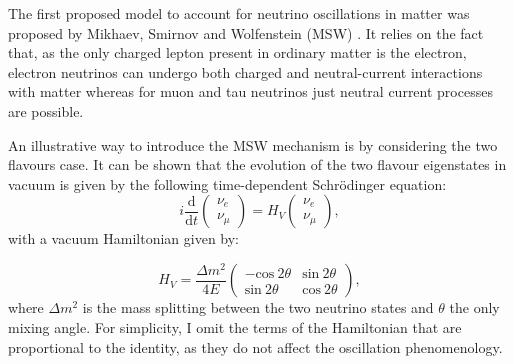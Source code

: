 The first proposed model to account for neutrino oscillations in matter was proposed by Mikhaev, Smirnov and Wolfenstein (MSW) \cite{Wolfenstein1977}. It relies on the fact that, as the only charged lepton present in ordinary matter is the electron, electron neutrinos can undergo both charged and neutral-current interactions with matter whereas for muon and tau neutrinos just neutral current processes are possible.

An illustrative way to introduce the MSW mechanism is by considering the two flavours case. It can be shown that the evolution of the two flavour eigenstates in vacuum is given by the following time-dependent Schrödinger equation:
\begin{equation}
	i \frac{\mathrm{d}}{\mathrm{d}t} \begin{pmatrix}\nu_{e}\\\nu_{\mu}\end{pmatrix} = H_{V} \begin{pmatrix}\nu_{e}\\\nu_{\mu}\end{pmatrix},
\end{equation}
with a vacuum Hamiltonian given by:

\begin{equation}
	H_{V} = \frac{\Delta m^{2}}{4E} \begin{pmatrix}-\mathrm{cos}~2\theta&\mathrm{sin}~2\theta\\\mathrm{sin}~2\theta&\mathrm{cos}~2\theta\end{pmatrix},
\end{equation}
where $\Delta m^{2}$ is the mass splitting between the two neutrino states and $\theta$ the only mixing angle. For simplicity, I omit the terms of the Hamiltonian that are proportional to the identity, as they do not affect the oscillation phenomenology.

